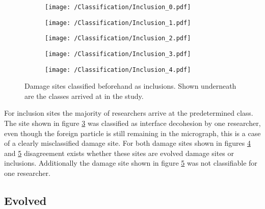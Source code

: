 \begin{figure}[H]
\begin{subfigure}{.2\textwidth}
\centering
  \texttt{[image: /Classification/Inclusion\_0.pdf]}
  \caption{}
  \label{fig:Inc1}
\end{subfigure}%
\begin{subfigure}{.2\textwidth}
\centering
  \texttt{[image: /Classification/Inclusion\_1.pdf]}
  \caption{}
  \label{fig:Inc2}
\end{subfigure}%
\centering
\begin{subfigure}{.2\textwidth}
\centering
  \texttt{[image: /Classification/Inclusion\_2.pdf]}
  \caption{}
  \label{fig:Inc3}
\end{subfigure}%
\begin{subfigure}{.2\textwidth}
\centering
  \texttt{[image: /Classification/Inclusion\_3.pdf]}
  \caption{}
  \label{fig:Inc4}
\end{subfigure}%
\begin{subfigure}{.2\textwidth}
\centering
  \texttt{[image: /Classification/Inclusion\_4.pdf]}
  \caption{}
  \label{fig:Inc5}
\end{subfigure}%
\caption{Damage sites classified beforehand as inclusions. Shown underneath are the classes arrived at in the study.}
\label{fig:classes}
\end{figure}

For inclusion sites the majority of researchers arrive at the predetermined class. The site shown in figure \ref{fig:Inc3} was classified as interface decohesion by one researcher, even though the foreign particle is still remaining in the micrograph, this is a case of a clearly misclassified damage site. For both damage sites shown in figures \ref{fig:Inc4} and \ref{fig:Inc5} disagreement exists whether these sites are evolved damage sites or inclusions. Additionally the damage site shown in figure \ref{fig:Inc5} was not classifiable for one researcher.



\subsection{Evolved}

